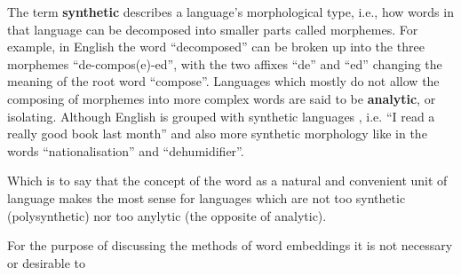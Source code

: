 The term \textbf{synthetic} describes a language's morphological type, i.e., how words in that language can be decomposed into smaller parts called morphemes. For example, in English the word ``decomposed'' can be broken up into the three morphemes ``de-compos(e)-ed'', with the two affixes ``de'' and ``ed'' changing the meaning of the root word ``compose''. Languages which mostly do not allow the composing of morphemes into more complex words are said to be \textbf{analytic}, or isolating. Although English is grouped with synthetic languages , i.e. ``I read a really good book last month'' and also more synthetic morphology like in the words ``nationalisation'' and ``dehumidifier''.

Which is to say that the concept of the word as a natural and convenient unit of language makes the most sense for languages which are not too synthetic (polysynthetic) nor too anylytic (the opposite of analytic).

For the purpose of discussing the methods of word embeddings it is not necessary or desirable to 
